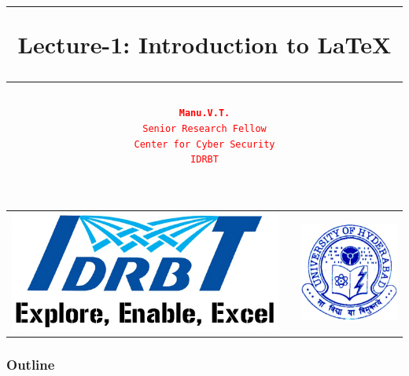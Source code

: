 \documentclass[12pt]{beamer}
\date{}
\title{\textcolor{idrbt_blue}{\rule{112mm}{1.25mm}} \textbf{Lecture-1: Introduction to \LaTeX{}}
	 \textcolor{idrbt_blue}{\rule{112mm}{1.25mm}}}
\author{\textcolor{red}{\texttt{\textbf{Manu.V.T.}\\ 
			{\scriptsize Senior Research Fellow\\ Center for Cyber Security\\IDRBT}}} }%
\begin{document}
	\begin{frame}
	\titlepage
	


\begin{center}
			\begin{tabular}{l>{\centering}p{6.25cm}<{\centering}l}
			\multirow{1}{*}{\includegraphics[scale=0.15]{./IDRBT_lowres.png}}
			&
         
			&
			\multirow{1}{*}{\includegraphics[scale=0.25]{./uoh.png}}
		\end{tabular}
\end{center}

\smallskip
	\renewcommand*{\arraystretch}{1.05}



\end{frame}

\begin{frame}
\frametitle{Outline}
\tableofcontents %
\end{frame}
\end{document}
